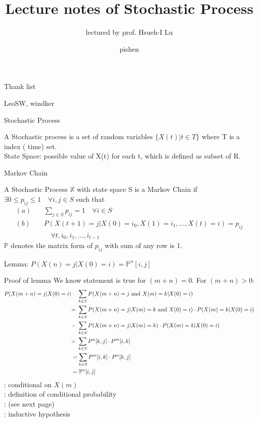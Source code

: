 \documentclass[mathserif]{beamer}
\title[Stochastic Process]{Lecture notes of Stochastic Process}
\subtitle{lectured by prof. Hsueh-I Lu}
\author{pishen}
\institute[AlgoLab]{AlgoLab, CSIE, NTU}
\begin{document}
\begin{frame}[plain]
	\titlepage
\end{frame}

\begin{frame}{Thank list}
\begin{center}
LeoSW, windker
\end{center}
\end{frame}

\begin{frame}{Stochastic Process}
	\begin{definition}
	A Stochastic process is a set of random variables $\{X(t) | t \in T\}$ where T is a index ( time) set. \\
	State Space: possible value of X(t) for each t, which is defined as subset of R.
	\end{definition}
\end{frame}

\begin{frame}{Markov Chain}
	\begin{definition}
	A Stochastic Process $\mathbb{X}$ with state space S is a Markov Chain if $\exists 0 \leq p_{ij} \leq 1 \quad \forall i,j \in S$ such that
	\begin{align*}
		(a) \quad & \sum_{j \in S} p_{ij} = 1 \quad \forall i \in S \\
		(b) \quad & P(X(t+1) = j | X(0) = i_0, X(1) = i_1, ..., X(t) = i) = p_{ij} \\
			& \quad \forall t, i_0,i _1, ..., i_{t-1}
	\end{align*}
	$\mathbb{P}$ denotes the matrix form of $p_{ij}$ with sum of any row is 1.
	\end{definition}
	Lemma: $P(X(n) = j | X(0) = i) = \mathbb{P}^n[i, j]$
\end{frame}

\begin{frame}{Proof of lemma}
	We know statement is true for $(m+n) = 0$. For $(m+n) > 0$: 
	\begin{align*}
	P(X(m+n) = j | X(0) = i)
		&\text{\color{yellow}{=} } \sum_{k \in S} P(X(m+n) = j \text{ and } X(m) = k | X(0) = i) \\
		&\text{\color{blue}{=} } \sum_{k \in S} P(X(m+n) = j | X(m) = k \text{ and } X(0) = i) \cdot P(X(m) = k | X(0) = i) \\
		&\text{\color{green}{=} } \sum_{k \in S} P(X(m+n) = j | X(m) = k) \cdot P(X(m) = k | X(0) = i) \\
		&\text{\color{red}{=} } \sum_{k \in S} P^n[k, j] \cdot P^m[i, k] \\
		&= \sum_{k \in S} P^m[i, k] \cdot P^n[k, j] \\
		&= \mathbb{P}^n[i, j]
	\end{align*}
	\color{yellow}{=}: conditional on $X(m)$ \\
	\color{blue}{=}: definition of conditional probability \\
	\color{green}{=}: (see next page) \\
	\color{red}{=}: inductive hypothesis
\end{frame}
\end{document}
